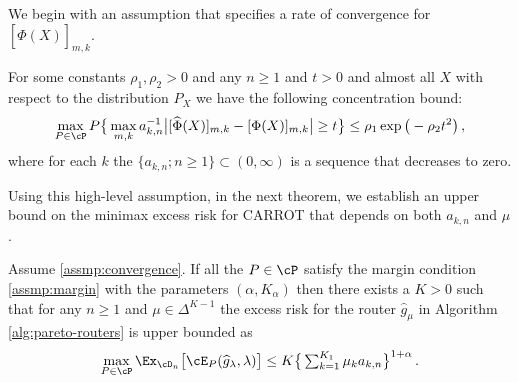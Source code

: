 We begin with an assumption that specifies a rate of convergence for $[\widehat \Phi(X)]_{m, k}$. 
\begin{assumption} \label{assmp:convergence}
    For some constants $\rho_1, \rho_2 > 0$ and any $n \ge 1$ and $t > 0$ and almost all $X$ with respect to the distribution $P_X$ we have the following concentration bound:
    \begin{align}\label{eq:concentration-phi}
        \max_{P\in \cP} P \big \{ \max_{m, k} a_{k, n}^{-1}\big |[\widehat \Phi (X)]_{m, k} - [\Phi  (X)]_{m, k}\big |
        \ge t\big \}  
        \le  \rho_1 \exp\big (- \rho_2  t^2 \big )\,,  
    \end{align}  where for each $k$ the  $\{a_{k,n}; n \ge 1\}\subset (0, \infty)$ is a sequence that decreases to zero. 
\end{assumption}
Using this high-level assumption, in the next theorem, we establish an upper bound on the minimax excess risk for CARROT that depends on both $a_{k, n}$ and $\mu$.  
\begin{theorem}\label{thm:upper-bound}
  Assume \ref{assmp:convergence}.   If all the $P\in \cP$ satisfy the margin condition \ref{assmp:margin} with the parameters $(\alpha, K_\alpha)$ then there exists a $K> 0$ such that for any $n \ge 1$ and $\mu\in \Delta^{K-1} $ the excess risk for the router $\widehat g_\mu$ in Algorithm \ref{alg:pareto-routers} is upper bounded as 
    \begin{equation}
        \max_{P\in \cP} \Ex_{\cD_n}\big [\cE_P(\widehat g_\lambda,\lambda)\big ] \le\textstyle K \big \{\sum_{k = 1}^{K_1} \mu_k a_{k, n}\big\}^{1+\alpha} \,.
    \end{equation}
\end{theorem} 


